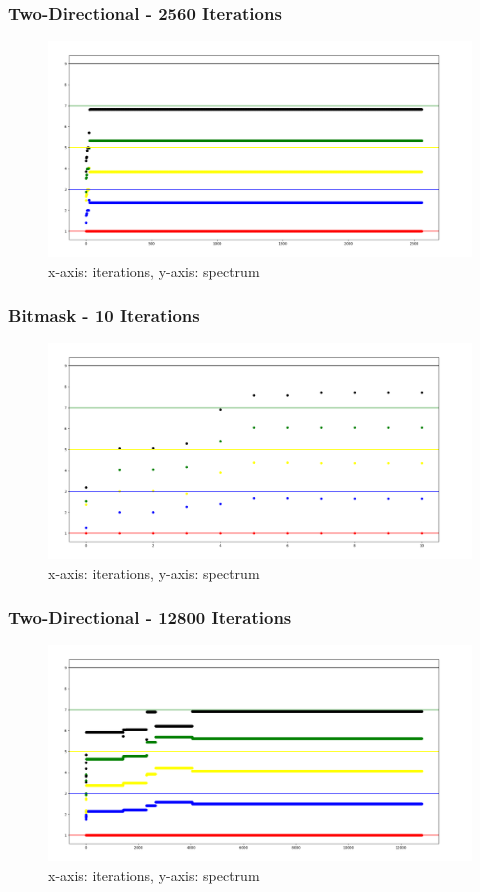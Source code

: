 \documentclass{beamer}
\begin{document}
\begin{frame}
\frametitle{Two-Directional - 2560 Iterations}
    \begin{figure}
        \centering
        \includegraphics[width=1.1\textwidth,height=2\textheight,keepaspectratio]{Two_2560.png}
        \caption{x-axis: iterations, y-axis: spectrum}
    \end{figure}
\end{frame}
\begin{frame}
\frametitle{Bitmask - 10 Iterations}
    \begin{figure}
        \centering
        \includegraphics[width=1.1\textwidth,height=2\textheight,keepaspectratio]{Bitmask_10.png}
        \caption{x-axis: iterations, y-axis: spectrum}
    \end{figure}
\end{frame}
\begin{frame}
\frametitle{Two-Directional - 12800 Iterations}
    \begin{figure}
        \centering
        \includegraphics[width=1.1\textwidth,height=2\textheight,keepaspectratio]{Two_12800.png}
        \caption{x-axis: iterations, y-axis: spectrum}
    \end{figure}
\end{frame}
\end{document}
